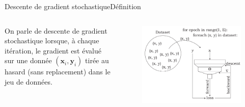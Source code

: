 \documentclass[12pt,dvipsnames,aspectratio=169]{beamer}
\newcommand{\x}[0]{\mathbf{x}}
\newcommand{\y}[0]{\mathbf{y}}
\begin{document}
\begin{frame}{Descente de gradient stochastique}{Définition}

\begin{columns}

    On parle de descente de gradient stochastique lorsque, à chaque itération, le gradient est évalué sur une donnée $(\x_i, \y_i)$ tirée au hasard (sans replacement) dans le jeu de données.


    \begin{figure}
        \centering
        \includegraphics[width=\textwidth]{figures/sgd.pdf}
    \end{figure}

\end{columns}

    
\end{frame}
\end{document}
